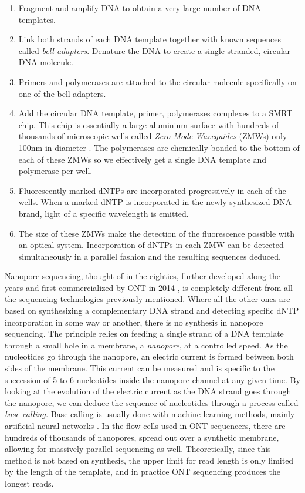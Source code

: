 \documentclass[
  11pt,
  twoside,
  BCOR=10mm,
  listof=totoc]{scrbook}
\providecommand{\tightlist}{%
  \setlength{\itemsep}{0pt}\setlength{\parskip}{0pt}}
\begin{document}
\begin{enumerate}
\def\labelenumi{\arabic{enumi}.}
\tightlist
\item
  Fragment and amplify DNA to obtain a very large number of DNA templates.
\item
  Link both strands of each DNA template together with known sequences called \emph{bell adapters}. Denature the DNA to create a single stranded, circular DNA molecule.
\item
  Primers and polymerases are attached to the circular molecule specifically on one of the bell adapters.
\item
  Add the circular DNA template, primer, polymerases complexes to a SMRT chip. This chip is essentially a large aluminium surface with hundreds of thousands of microscopic wells called \emph{Zero-Mode Waveguides} (ZMWs) only 100nm in diameter \autocite{leveneZeroModeWaveguidesSingleMolecule2003}. The polymerases are chemically bonded to the bottom of each of these ZMWs so we effectively get a single DNA template and polymerase per well.
\item
  Fluorescently marked dNTPs are incorporated progressively in each of the wells. When a marked dNTP is incorporated in the newly synthesized DNA brand, light of a specific wavelength is emitted.
\item
  The size of these ZMWs make the detection of the fluorescence possible with an optical system. Incorporation of dNTPs in each ZMW can be detected simultaneously in a parallel fashion and the resulting sequences deduced.
\end{enumerate}

Nanopore sequencing, thought of in the eighties, further developed along the years \autocite{clarkeContinuousBaseIdentification2009} and first commercialized by ONT in 2014 \autocite{deamerThreeDecadesNanopore2016}, is completely different from all the sequencing technologies previously mentioned. Where all the other ones are based on synthesizing a complementary DNA strand and detecting specific dNTP incorporation in some way or another, there is no synthesis in nanopore sequencing. The principle relies on feeding a single strand of a DNA template through a small hole in a membrane, a \emph{nanopore}, at a controlled speed. As the nucleotides go through the nanopore, an electric current is formed between both sides of the membrane. This current can be measured and is specific to the succession of 5 to 6 nucleotides inside the nanopore channel at any given time. By looking at the evolution of the electric current as the DNA strand goes through the nanopore, we can deduce the sequence of nucleotides through a process called \emph{base calling.} Base calling is usually done with machine learning methods, mainly artificial neural networks \autocite{wickPerformanceNeuralNetwork2019}. In the flow cells used in ONT sequencers, there are hundreds of thousands of nanopores, spread out over a synthetic membrane, allowing for massively parallel sequencing as well. Theoretically, since this method is not based on synthesis, the upper limit for read length is only limited by the length of the template, and in practice ONT sequencing produces the longest reads.
\end{document}
